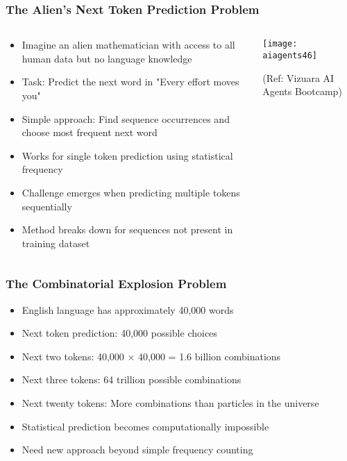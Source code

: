 \begin{frame}[fragile]\frametitle{The Alien's Next Token Prediction Problem}

\begin{columns}
    \begin{column}[T]{0.6\linewidth}
      \begin{itemize}
	  \item Imagine an alien mathematician with access to all human data but no language knowledge
	  \item Task: Predict the next word in "Every effort moves you"
	  \item Simple approach: Find sequence occurrences and choose most frequent next word
	  \item Works for single token prediction using statistical frequency
	  \item Challenge emerges when predicting multiple tokens sequentially
	  \item Method breaks down for sequences not present in training dataset
	  \end{itemize}

    \end{column}
    \begin{column}[T]{0.4\linewidth}
		\begin{center}
		\texttt{[image: aiagents46]}

		{\tiny (Ref: Vizuara AI Agents Bootcamp)}

		\end{center}	
    \end{column}
  \end{columns}
  
\end{frame}

\begin{frame}[fragile]\frametitle{The Combinatorial Explosion Problem}
      \begin{itemize}
	  \item English language has approximately 40,000 words
	  \item Next token prediction: 40,000 possible choices
	  \item Next two tokens: 40,000 × 40,000 = 1.6 billion combinations
	  \item Next three tokens: 64 trillion possible combinations
	  \item Next twenty tokens: More combinations than particles in the universe
	  \item Statistical prediction becomes computationally impossible
	  \item Need new approach beyond simple frequency counting
	  \end{itemize}
\end{frame}

